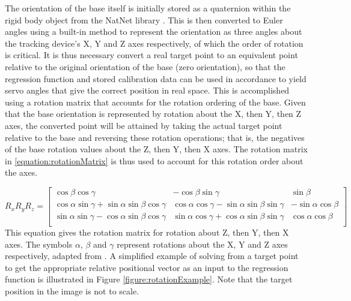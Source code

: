 \documentclass[11pt]{article}
\begin{document}
The orientation of the base itself is initially stored as a quaternion within the rigid body object from the NatNet library \cite{natnet2016}. This is then converted to Euler angles using a built-in method to represent the orientation as three angles about the tracking device's X, Y and Z axes respectively, of which the order of rotation is critical. It is thus necessary convert a real target point to an equivalent point relative to the original orientation of the base (zero orientation), so that the regression function and stored calibration data can be used in accordance to yield servo angles that give the correct position in real space. This is accomplished using a rotation matrix that accounts for the rotation ordering of the base. Given that the base orientation is represented by rotation about the X, then Y, then Z axes, the converted point will be attained by taking the actual target point relative to the base and reversing these rotation operations; that is, the negatives of the base rotation values about the Z, then Y, then X axes. The rotation matrix in \eqref{equation:rotationMatrix} is thus used to account for this rotation order about the axes. 

\begin{equation}\label{equation:rotationMatrix}
R_{x}R_{y}R_{z} = 
\begin{bmatrix*}
\cos\beta\cos\gamma & -\cos\beta\sin\gamma & \sin\beta \\
\cos\alpha\sin\gamma + \sin\alpha\sin\beta\cos\gamma & \cos\alpha\cos\gamma - \sin\alpha\sin\beta\sin\gamma & -\sin\alpha\cos\beta \\
\sin\alpha\sin\gamma - \cos\alpha\sin\beta\cos\gamma & \sin\alpha\cos\gamma + \cos\alpha\sin\beta\sin\gamma & \cos\alpha\cos\beta \\
\end{bmatrix*}
\end{equation}
This equation gives the rotation matrix for rotation about Z, then Y, then X axes. The symbols $\alpha$, $\beta$ and $\gamma$ represent rotations about the X, Y and Z axes respectively, adapted from \cite{3drotation}. A simplified example of solving from a target point to get the appropriate relative positional vector as an input to the regression function is illustrated in Figure \ref{figure:rotationExample}. Note that the target position in the image is not to scale. 
\end{document}
